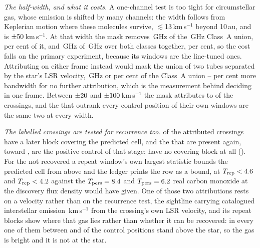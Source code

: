 \emph{The half-width, and what it costs.} A one-channel test is too tight for
circumstellar gas, whose emission is shifted by many channels: the width
follows from Keplerian motion where these molecules survive,
$\lesssim$13\,km\,s$^{-1}$ beyond 10\,au, and is
$\pm50$\,km\,s$^{-1}$. At that width the mask removes
\MkMaskAGHz\,GHz of the \CvUnionA\,GHz Class~A union, \MkMaskAPct{} per cent
of it, and \FrMaskLostGHz\,GHz of \FrMaskUnionGHz\,GHz over both classes
together, \FrMaskPct{} per cent, so the cost falls on the primary
experiment, because its windows are the line-tuned ones.
Attributing on either frame instead would mask the union of two tubes
separated by the star's LSR velocity, \LsMaskTwoGHz\,GHz or
\LsMaskTwoPct{} per cent of the Class~A union -- \LsMaskAddPct{} per cent
more bandwidth for no further attribution, which is the measurement behind
deciding in one frame. Between $\pm20$ and
$\pm100$\,km\,s$^{-1}$ the mask attributes \FrAttrWTwenty{} to
\FrAttrWHundred{} of the crossings, and the \FrNRankPass{} that outrank
every control position of their own windows are the same two at every
width.

\emph{The labelled crossings are tested for recurrence too.} \MkAttrTested{}
of the \MkAttr{} attributed crossings have a later block covering the
predicted cell, and the \MkAttrRecur{} that are present again, toward
\MkAttrRecurStars, are the positive control of that stage; \MkAttrUntest{}
have no covering block at all (\MkAttrUntestNames). For the \MkAttrExcl{}
not recovered a repeat window's own largest statistic bounds the predicted
cell from above and the ledger prints the row as a bound, at
$T_{\rm rep}<4.6$ and $T_{\rm rep}<4.2$ against the
$T_{\rm pers}=8.4$ and $T_{\rm pers}=6.2$ real carbon
monoxide at the discovery flux density would have given. One of those two
attributions rests on a velocity rather than on the recurrence test, the
sightline carrying catalogued interstellar emission
\LsLupDv\,km\,s$^{-1}$ from the crossing's own LSR velocity, and its repeat
blocks show where that gas lies rather than whether it can be recovered:
in every one of them between
\RqAjNgeLo{} and \RqAjNgeHi{} of the \NCtrl{} control positions stand above
the star, so the gas is bright and it is not at the star.
